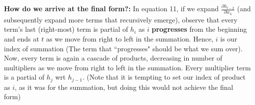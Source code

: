 \documentclass[12pt, letterpaper]{article}
\begin{document}

\textbf{How do we arrive at the final form?:} In equation 11, if we expand $\frac{\partial h_{t-2}}{\partial w_h}$
(and subsequently expand more terms that recursively emerge), observe that every term's last (right-most) 
term is  partial of $h_i$ as $i$ \textbf{progresses} from the beginning and ends at $t$ as we move from right to left
in the summation. Hence, $i$ is our index of summation (The term that ``progresses" should be what we sum over).
Now, every term is again a cascade of products, decreasing in number of multipliers as we move from right to left in the summation.
Every multiplier term is a partial of $h_j$ wrt $h_{j-1}$. (Note that it is tempting to set our index of product as 
$i$, as it was for the summation, but doing this would not achieve the final form)


\printbibliography
\end{document}
